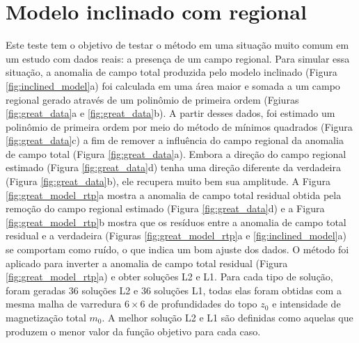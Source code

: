 \section{Modelo inclinado com regional}

Este teste tem o objetivo de testar o método em uma situação muito comum em um estudo com dados reais: a presença de um campo regional.
Para simular essa situação, a anomalia de campo total produzida pelo modelo inclinado (Figura \ref{fig:inclined_model}a) foi calculada em uma área maior e somada a um campo regional gerado através de um polinômio de primeira ordem (Fgiuras \ref{fig:great_data}a e \ref{fig:great_data}b).
A partir desses dados, foi estimado um polinômio de primeira ordem por meio do método de mínimos quadrados (Figura \ref{fig:great_data}c) a fim de remover a influência do campo regional da anomalia de campo total (Figura \ref{fig:great_data}a).
Embora a direção do campo regional estimado (Figura \ref{fig:great_data}d) tenha uma direção diferente da verdadeira (Figura \ref{fig:great_data}b), ele recupera muito bem sua amplitude.
A Figura \ref{fig:great_model_rtp}a mostra a anomalia de campo total residual obtida pela remoção do campo regional estimado (Figura \ref{fig:great_data}d) e a Figura \ref{fig:great_model_rtp}b mostra que os resíduos entre a anomalia de campo total residual e a verdadeira (Figuras \ref{fig:great_model_rtp}a e \ref{fig:inclined_model}a) se comportam como ruído, o que indica um bom ajuste dos dados.
O método foi aplicado para inverter a anomalia de campo total residual (Figura \ref{fig:great_model_rtp}a) e obter soluções L2 e L1.
Para cada tipo de solução, foram geradas $36$ soluções L2 e $36$ soluções L1, 
todas elas foram obtidas com a mesma malha de varredura $6 \times 6$ de profundidades do topo $z_{0}$ e intensidade de magnetização total $m_{0}$.
A melhor solução L2 e L1 são definidas como aquelas que produzem o menor valor da função objetivo para cada caso.


